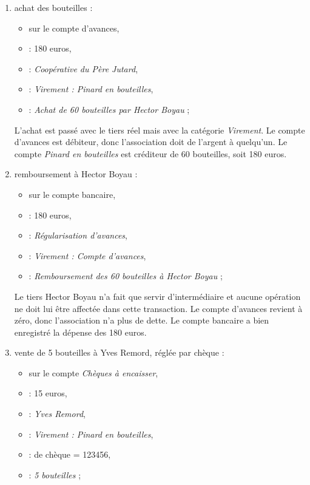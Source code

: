 \begin{enumerate}
	\item achat des bouteilles :
		\begin{itemize}
			\item sur le compte d'avances,
			\item {} : 180 euros,
			\item {} : \emph{Coopérative du Père Jutard},
			\item {} : \emph{Virement : Pinard en bouteilles},
			\item {} : \emph{Achat de 60 bouteilles par Hector Boyau} ;
		\end{itemize}

L'achat est passé avec le tiers réel mais avec la catégorie  \emph{Virement}. Le compte d'avances est débiteur, donc l'association doit de l'argent à quelqu'un. Le compte \emph{Pinard en bouteilles} est créditeur de 60 bouteilles, soit 180 euros.
 
	\item remboursement à Hector Boyau :
		\begin{itemize}
			\item sur le compte bancaire,
			\item {}  : 180 euros,
			\item {}  : \emph{Régularisation d'avances},
			\item {} : \emph{Virement : Compte d'avances},
			\item {} : \emph{Remboursement des 60 bouteilles à Hector Boyau} ;
		\end{itemize}

Le tiers Hector Boyau n'a fait que servir d'intermédiaire et aucune opération ne doit lui être affectée dans cette transaction. Le compte d'avances revient à zéro, donc l'association n'a plus de dette. Le compte bancaire a bien enregistré la dépense des 180 euros. 

	\item vente de 5 bouteilles à Yves Remord, réglée par chèque :
		\begin{itemize}
			\item sur le compte \emph{Chèques à encaisser},
			\item {} : 15 euros,
			\item {} : \emph{Yves Remord},
			\item {} : \emph{Virement : Pinard en bouteilles},
			\item {} : \no de chèque = 123456,
			\item {} : \emph{5 bouteilles} ;
		\end{itemize}


\end{enumerate}
